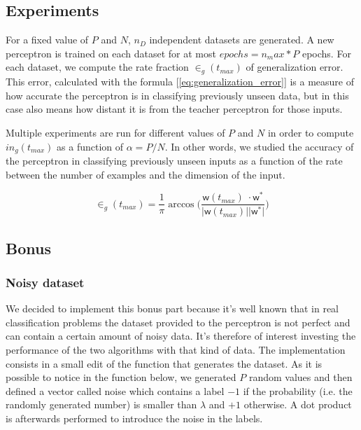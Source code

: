 \subsection{Experiments}
For a fixed value of $P$ and $N$, $n_D$ independent datasets are generated. A new perceptron is trained on each dataset for at most $epochs = n_max * P$ epochs.
For each dataset, we compute the rate fraction $\in_g(t_{max})$ of generalization error. This error, calculated with the formula [\ref{eq:generalization_error}]
is a measure of how accurate the perceptron is in classifying previously unseen data, but in this case also means how distant it is from the teacher perceptron for those inputs.

Multiple experiments are run for different values of $P$ and $N$ in order to compute $in_g(t_{max})$ as a function of $\alpha = P / N$.
In other words, we studied the accuracy of the perceptron in classifying previously unseen inputs as a function of the rate between the number of examples and the dimension of the input.


\begin{equation} \label{eq:generalization_error}
    \in_g(t_{max}) = \frac{1}{\pi} \arccos \bigg(\frac{\bm{\mathsf{w}}(t_{max})\;\cdotp \bm{\mathsf{w}}^*}{\lvert \bm{\mathsf{w}}(t_{max}) \rvert \lvert \bm{\mathsf{w}}^* \rvert} \bigg)
\end{equation}

\subsection{Bonus}
\subsubsection{Noisy dataset}
We decided to implement this bonus part because it's well known that in real classification problems the dataset provided to the perceptron is not perfect and can contain a certain
amount of noisy data. It's therefore of interest investing the performance of the two algorithms with that kind of data. The implementation consists in a small edit of the function
that generates the dataset. As it is possible to notice in the function below, we generated $P$ random values and then defined a vector called noise which contains
a label $-1$ if the probability (i.e. the randomly generated number) is smaller than $\lambda$ and $+1$ otherwise. A dot product is afterwards performed to introduce the noise in
the labels.